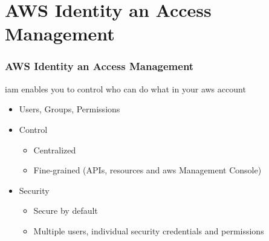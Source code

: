 \documentclass{beamer}
\begin{document}
\section{AWS Identity an Access Management}
\begin{frame}[fragile]
\frametitle{AWS Identity an Access Management}
\acrfull{iam} enables you to control \alert{who can do what} in your \acrfull{aws} account
\begin{itemize}
 \item Users, Groups, Permissions
 \item Control
  \begin{itemize}
   \item Centralized
   \item Fine-grained (APIs, resources and \acrshort{aws} Management Console)
  \end{itemize}

 \item Security
 \begin{itemize}
    \item Secure by default
    \item Multiple users, individual security credentials and permissions
  \end{itemize}
\end{itemize}
\end{frame}
\end{document}
